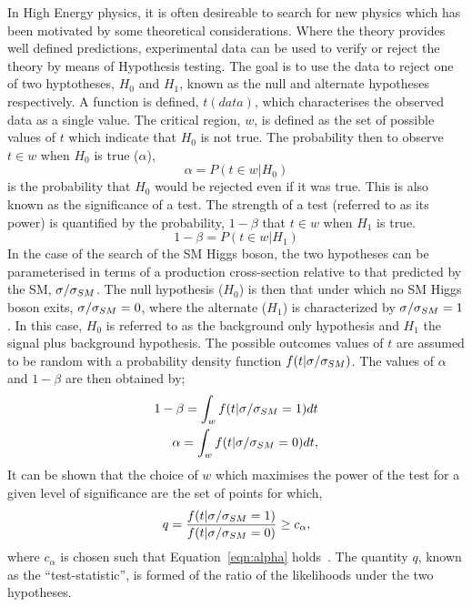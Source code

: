 In High Energy physics, it is often desireable to search for new physics 
which has been motivated by some theoretical considerations. 
Where the theory provides well defined predictions,
experimental data can be used to verify or reject the theory
by means of Hypothesis testing. The goal is to use the data 
to reject one of two hyptotheses,
$H_{0}$ and $H_{1}$, known as the null and alternate hypotheses
respectively. A function is defined, $t(data)$,
which characterises the observed data as a single value. The critical
region, $w$, is defined as the set of possible values of $t$
which indicate that $H_{0}$ is not true. The probability then 
to observe $t\in w$ when $H_{0}$ is true ($\alpha$), 
\begin{equation}
\alpha = P(t\in w|H_{0})
\end{equation}
is the probability that $H_{0}$ would be rejected even if it was true.
This is also known as the significance of a test.
The strength of a test (referred to as its power) is quantified by 
the probability, $1-\beta$ that $t \in  w$ when $H_{1}$ is true.
\begin{equation}
1-\beta = P(t\in w|H_{1})
\end{equation}
In the case of the search of the SM Higgs boson, the two hypotheses
can be parameterised in terms of a production cross-section relative
to that predicted by the SM, $\sigma/\sigma_{SM}$.  
The null hypothesis ($H_{0}$) is then that under which no SM Higgs boson exits,
$\sigma/\sigma_{SM}=0$, where the alternate ($H_{1}$) is characterized by $\sigma/\sigma_{SM}=1$.
In this case, $H_{0}$ is referred to as the background only hypothesis
and $H_{1}$ the signal plus background hypothesis.
The possible outcomes values of $t$ are assumed to be random with a probability density
function $f(t|\sigma/\sigma_{SM})$.  The values of $\alpha$ and $1-\beta$ are then obtained by;
\begin{eqnarray}
1-\beta =  \int_{w}f(t|\sigma/\sigma_{SM}=1)dt\\ 
\alpha =  \int_{w}f(t|\sigma/\sigma_{SM}=0)dt,
\label{eqn:alpha}
\end{eqnarray}
It can be shown that the choice of $w$ which maximises the power of the test for 
a given level of significance are the set of points for which,
\begin{equation} 
	q = \frac {\displaystyle f(t|\sigma/\sigma_{SM}=1)}{\displaystyle f(t|\sigma/\sigma_{SM}=0)} \ge c_{\alpha},
\end{equation}
where $c_{\alpha}$ is chosen such that Equation~\ref{eqn:alpha} holds~\cite{null}.
The quantity $q$, known as the ``test-statistic'', is formed of the 
ratio of the likelihoods under the two hypotheses. 

